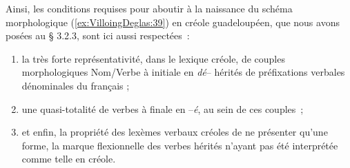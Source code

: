 \documentclass[output=paper]{langsci/langscibook}
\begin{document}
\ea \label{ex:VilloingDeglas:37}
      \z
\ex \label{ex:VilloingDeglas:38}
      \z
\z

Ainsi, les conditions requises pour aboutir à la naissance du schéma
morphologique (\ref{ex:VilloingDeglas:39}) en créole guadeloupéen, que nous avons posées au §
3.2.3, sont ici aussi respectées~:

\begin{enumerate}
\def\labelenumi{\arabic{enumi})}

\item
  la très forte représentativité, dans le lexique créole, de couples
  morphologiques Nom/Verbe à initiale en \emph{dé}-- hérités de
  préfixations verbales dénominales du français ;
\item
  une quasi-totalité de verbes à finale en --\emph{é}, au sein de ces
  couples~;
\item
  et enfin, la propriété des lexèmes verbaux créoles de ne présenter
  qu'une forme, la marque flexionnelle des verbes hérités n'ayant pas
  été interprétée comme telle en créole.
\end{enumerate}
\end{document}
